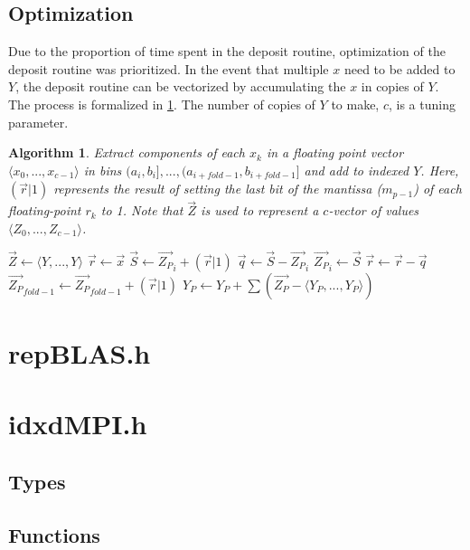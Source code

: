 \documentclass[12pt]{article}
\theoremstyle{plain}
\newtheorem{alg}{Algorithm}[section]
\begin{document}
  \subsection{Optimization}
    Due to the proportion of time spent in the deposit routine, optimization of the deposit routine was prioritized. In the event that multiple $x$ need to be added to $Y$, the deposit routine can be vectorized by accumulating the $x$ in copies of $Y$. The process is formalized in \ref{alg:depositvectorized}. The number of copies of $Y$ to make, $c$, is a tuning parameter.
      \begin{alg}
        Extract components of each $x_k$ in a floating point vector $\langle x_0, ..., x_{c - 1} \rangle$ in bins $(a_i, b_i], ..., (a_{i + fold - 1}, b_{i + fold - 1}]$ and add to indexed $Y$. Here, $(\vec{r} | 1)$ represents the result of setting the last bit of the mantissa ($m_{p - 1}$) of each floating-point $r_k$ to 1. Note that $\vec{Z}$ is used to represent a $c$-vector of values $\langle Z_0, ..., Z_{c - 1} \rangle$.
        \begin{algorithmic}
            \State $\vec{Z} \gets \langle Y, ..., Y \rangle$
            \State $\vec{r} \gets \vec{x}$
              \State $\vec{S} \gets {\vec{Z_P}}_i + (\vec{r} | 1)$
              \State $\vec{q} \gets \vec{S} - {\vec{Z_P}}_i$
              \State ${\vec{Z_P}}_i \gets \vec{S}$
              \State $\vec{r} \gets \vec{r} - \vec{q}$
            \EndFor
            \State ${\vec{Z_P}}_{fold - 1} \gets {\vec{Z_P}}_{fold - 1} + (\vec{r} | 1)$
            \State $Y_P \gets Y_P + \sum(\vec{Z_P} - \langle Y_P, ..., Y_P \rangle)$
          \EndFunction
        \end{algorithmic}
        \label{alg:depositvectorized}
      \end{alg}
\section{repBLAS.h}
\section{idxdMPI.h}
  \subsection{Types}
  \subsection{Functions}
\end{document}
